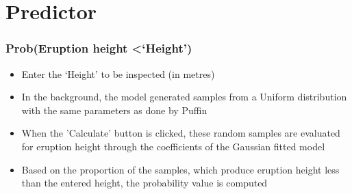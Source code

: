\documentclass[10pt]{beamer}
\begin{document}
\section{Predictor}
\begin{frame}
\frametitle{Prob(Eruption height \textless `Height')}

\begin{itemize}
    \item Enter the `Height' to be inspected (in metres)
    \item In the background, the model generated samples from a Uniform distribution with the same parameters as done by Puffin
    \item When the 'Calculate' button is clicked, these random samples are evaluated for eruption height through the coefficients of the Gaussian fitted model
    \item Based on the proportion of the samples, which produce eruption height less than the entered height, the probability value is computed
\end{itemize}

\end{frame}






\begin{frame}
\Large
\begin{center}
\end{center}
\end{frame}
\end{document}
